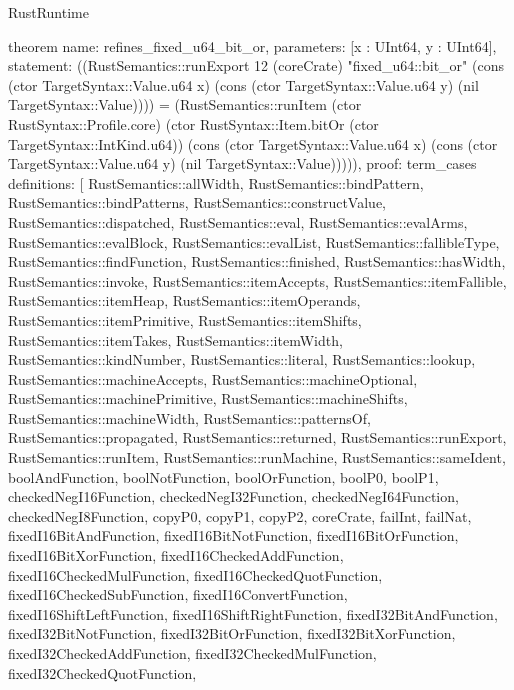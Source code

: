 \begin{lexlean}{RustRuntime}
\begin{semanticmodule}
theorem{
  name: refines_fixed_u64_bit_or,
  parameters: [x : UInt64, y : UInt64],
  statement: ((RustSemantics::runExport 12 (coreCrate) "fixed_u64::bit_or" (cons (ctor TargetSyntax::Value.u64 x) (cons (ctor TargetSyntax::Value.u64 y) (nil TargetSyntax::Value)))) = (RustSemantics::runItem (ctor RustSyntax::Profile.core) (ctor RustSyntax::Item.bitOr (ctor TargetSyntax::IntKind.u64)) (cons (ctor TargetSyntax::Value.u64 x) (cons (ctor TargetSyntax::Value.u64 y) (nil TargetSyntax::Value))))),
  proof: term_cases{
    definitions: [
      RustSemantics::allWidth,
      RustSemantics::bindPattern,
      RustSemantics::bindPatterns,
      RustSemantics::constructValue,
      RustSemantics::dispatched,
      RustSemantics::eval,
      RustSemantics::evalArms,
      RustSemantics::evalBlock,
      RustSemantics::evalList,
      RustSemantics::fallibleType,
      RustSemantics::findFunction,
      RustSemantics::finished,
      RustSemantics::hasWidth,
      RustSemantics::invoke,
      RustSemantics::itemAccepts,
      RustSemantics::itemFallible,
      RustSemantics::itemHeap,
      RustSemantics::itemOperands,
      RustSemantics::itemPrimitive,
      RustSemantics::itemShifts,
      RustSemantics::itemTakes,
      RustSemantics::itemWidth,
      RustSemantics::kindNumber,
      RustSemantics::literal,
      RustSemantics::lookup,
      RustSemantics::machineAccepts,
      RustSemantics::machineOptional,
      RustSemantics::machinePrimitive,
      RustSemantics::machineShifts,
      RustSemantics::machineWidth,
      RustSemantics::patternsOf,
      RustSemantics::propagated,
      RustSemantics::returned,
      RustSemantics::runExport,
      RustSemantics::runItem,
      RustSemantics::runMachine,
      RustSemantics::sameIdent,
      boolAndFunction,
      boolNotFunction,
      boolOrFunction,
      boolP0,
      boolP1,
      checkedNegI16Function,
      checkedNegI32Function,
      checkedNegI64Function,
      checkedNegI8Function,
      copyP0,
      copyP1,
      copyP2,
      coreCrate,
      failInt,
      failNat,
      fixedI16BitAndFunction,
      fixedI16BitNotFunction,
      fixedI16BitOrFunction,
      fixedI16BitXorFunction,
      fixedI16CheckedAddFunction,
      fixedI16CheckedMulFunction,
      fixedI16CheckedQuotFunction,
      fixedI16CheckedSubFunction,
      fixedI16ConvertFunction,
      fixedI16ShiftLeftFunction,
      fixedI16ShiftRightFunction,
      fixedI32BitAndFunction,
      fixedI32BitNotFunction,
      fixedI32BitOrFunction,
      fixedI32BitXorFunction,
      fixedI32CheckedAddFunction,
      fixedI32CheckedMulFunction,
      fixedI32CheckedQuotFunction,
}}
\end{semanticmodule}
\end{lexlean}
